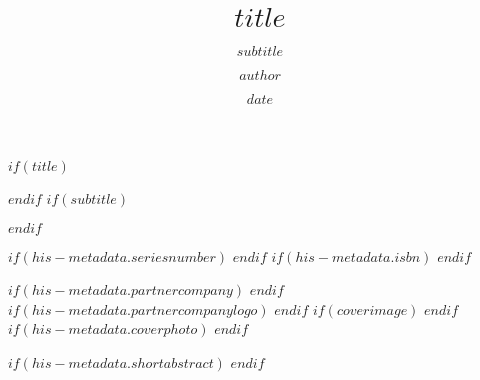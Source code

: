 $if(title)$
\title{$title$}
$endif$
$if(subtitle)$
\subtitle{$subtitle$}
$endif$
\author{$author$}
\date{$date$} %
$if(his-metadata.seriesnumber)$
$endif$
$if(his-metadata.isbn)$
$endif$


$if(his-metadata.partnercompany)$
$endif$
$if(his-metadata.partnercompanylogo)$
$endif$
$if(coverimage)$
$endif$
$if(his-metadata.coverphoto)$
$endif$

$if(his-metadata.shortabstract)$
$endif$

